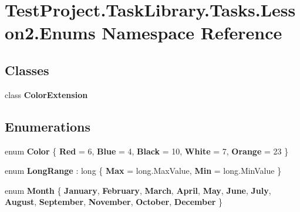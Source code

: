 \hypertarget{namespace_test_project_1_1_task_library_1_1_tasks_1_1_lesson2_1_1_enums}{}\section{Test\+Project.\+Task\+Library.\+Tasks.\+Lesson2.\+Enums Namespace Reference}
\label{namespace_test_project_1_1_task_library_1_1_tasks_1_1_lesson2_1_1_enums}
\subsection*{Classes}
\begin{DoxyCompactItemize}
\item 
class {\bfseries Color\+Extension}
\end{DoxyCompactItemize}
\subsection*{Enumerations}
\begin{DoxyCompactItemize}
\item 
\mbox{\label{namespace_test_project_1_1_task_library_1_1_tasks_1_1_lesson2_1_1_enums_a732646d09dc89f885d0e46df8662d9af}} 
enum {\bfseries Color} \{ \newline
{\bfseries Red} = 6, 
{\bfseries Blue} = 4, 
{\bfseries Black} = 10, 
{\bfseries White} = 7, 
\newline
{\bfseries Orange} = 23
 \}
\item 
\mbox{\label{namespace_test_project_1_1_task_library_1_1_tasks_1_1_lesson2_1_1_enums_ae8996e4637c739807220386302f9b93c}} 
enum {\bfseries Long\+Range} \+: long \{ {\bfseries Max} = long.\+Max\+Value, 
{\bfseries Min} = long.\+Min\+Value
 \}
\item 
\mbox{\label{namespace_test_project_1_1_task_library_1_1_tasks_1_1_lesson2_1_1_enums_aa5ff40b0148d7457b5077ecbb5ec99ad}} 
enum {\bfseries Month} \{ \newline
{\bfseries January}, 
{\bfseries February}, 
{\bfseries March}, 
{\bfseries April}, 
\newline
{\bfseries May}, 
{\bfseries June}, 
{\bfseries July}, 
{\bfseries August}, 
\newline
{\bfseries September}, 
{\bfseries November}, 
{\bfseries October}, 
{\bfseries December}
 \}
\end{DoxyCompactItemize}
